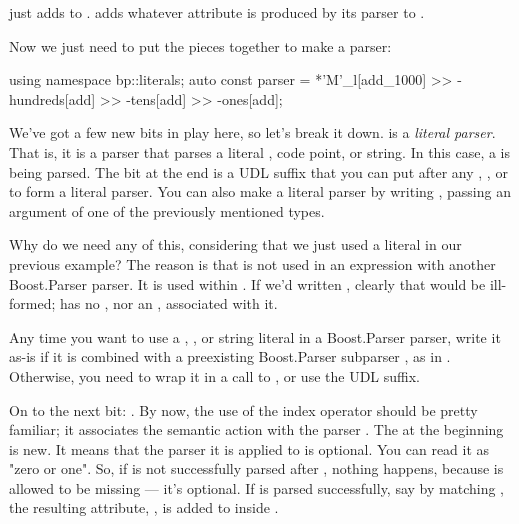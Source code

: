 \documentclass{MyBook}
\begin{document}
 just adds  to .  adds whatever attribute is produced by its parser to .

Now we just need to put the pieces together to make a parser:

\begin{code}
using namespace bp::literals;
auto const parser =
    *'M'_l[add_1000] >> -hundreds[add] >> -tens[add] >> -ones[add];
\end{code}

We've got a few new bits in play here, so let's break it down.  is a \emph{literal parser}. That is, it is a parser that parses a literal , code point, or string. In this case, a   is being parsed. The  bit at the end is a UDL suffix that you can put after any , , or  to form a literal parser. You can also make a literal parser by writing , passing an argument of one of the previously mentioned types.

Why do we need any of this, considering that we just used a literal  in our previous example? The reason is that  is not used in an expression with another Boost.Parser parser. It is used within . If we'd written , clearly that would be ill-formed;  has no , nor an , associated with it.

\begin{marker}[title=Tip ]
Any time you want to use a , , or string literal in a Boost.Parser parser, write it as-is if it is combined with a preexisting Boost.Parser subparser , as in . Otherwise, you need to wrap it in a call to , or use the  UDL suffix. 
\end{marker}

On to the next bit: . By now, the use of the index operator should be pretty familiar; it associates the semantic action  with the parser . The  at the beginning is new. It means that the parser it is applied to is optional. You can read it as "zero or one". So, if  is not successfully parsed after , nothing happens, because  is allowed to be missing --- it's optional. If  is parsed successfully, say by matching , the resulting attribute, , is added to  inside .
\end{document}
